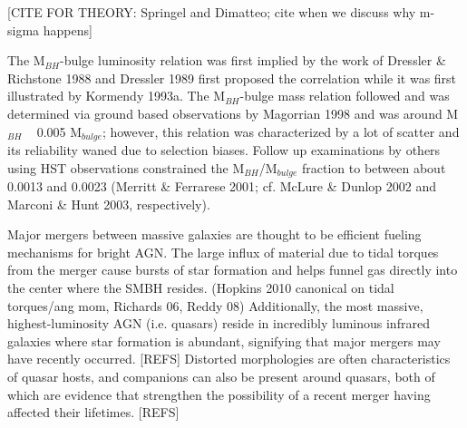 \documentclass[manuscript]{aastex}
\begin{document}


[CITE FOR THEORY: Springel and Dimatteo; cite when we discuss why m-sigma happens]



The M$_{BH}$-bulge luminosity relation was first implied by the work of Dressler \& Richstone 1988 and Dressler 1989 first proposed the correlation while it was first illustrated by Kormendy 1993a. The M$_{BH}$-bulge mass relation followed and was determined via ground based observations by Magorrian 1998 and was around M$_{BH}$ ~ 0.005 M$_{bulge}$; however, this relation was characterized by a lot of scatter and its reliability waned due to selection biases.  Follow up examinations by others using HST observations constrained the M$_{BH}$/M$_{bulge}$ fraction to between about 0.0013 and 0.0023 (Merritt \& Ferrarese 2001; cf. McLure \& Dunlop 2002 and Marconi \& Hunt 2003, respectively). 

Major mergers between massive galaxies are thought to be efficient fueling mechanisms for bright AGN. The large influx of material due to tidal torques from the merger cause bursts of star formation and helps funnel gas directly into the center where the SMBH resides. (Hopkins 2010 canonical on tidal torques/ang mom, Richards 06, Reddy 08) Additionally, the most massive, highest-luminosity AGN (i.e. quasars) reside in incredibly luminous infrared galaxies where star formation is abundant, signifying that major mergers may have recently occurred. [REFS] Distorted morphologies are often characteristics of quasar hosts, and companions can also be present around quasars, both of which are evidence that strengthen the possibility of a recent merger having affected their lifetimes. [REFS] 
\end{document}
